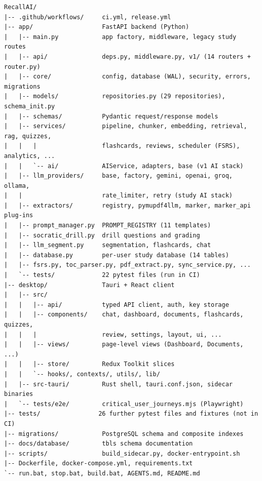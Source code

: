 \begin{lstlisting}[caption={Repository folder structure (commit \texttt{60d40f9})},label={lst:tree}]
RecallAI/
|-- .github/workflows/     ci.yml, release.yml
|-- app/                   FastAPI backend (Python)
|   |-- main.py            app factory, middleware, legacy study routes
|   |-- api/               deps.py, middleware.py, v1/ (14 routers + router.py)
|   |-- core/              config, database (WAL), security, errors, migrations
|   |-- models/            repositories.py (29 repositories), schema_init.py
|   |-- schemas/           Pydantic request/response models
|   |-- services/          pipeline, chunker, embedding, retrieval, rag, quizzes,
|   |   |                  flashcards, reviews, scheduler (FSRS), analytics, ...
|   |   `-- ai/            AIService, adapters, base (v1 AI stack)
|   |-- llm_providers/     base, factory, gemini, openai, groq, ollama,
|   |                      rate_limiter, retry (study AI stack)
|   |-- extractors/        registry, pymupdf4llm, marker, marker_api plug-ins
|   |-- prompt_manager.py  PROMPT_REGISTRY (11 templates)
|   |-- socratic_drill.py  drill questions and grading
|   |-- llm_segment.py     segmentation, flashcards, chat
|   |-- database.py        per-user study database (14 tables)
|   |-- fsrs.py, toc_parser.py, pdf_extract.py, sync_service.py, ...
|   `-- tests/             22 pytest files (run in CI)
|-- desktop/               Tauri + React client
|   |-- src/
|   |   |-- api/           typed API client, auth, key storage
|   |   |-- components/    chat, dashboard, documents, flashcards, quizzes,
|   |   |                  review, settings, layout, ui, ...
|   |   |-- views/         page-level views (Dashboard, Documents, ...)
|   |   |-- store/         Redux Toolkit slices
|   |   `-- hooks/, contexts/, utils/, lib/
|   |-- src-tauri/         Rust shell, tauri.conf.json, sidecar binaries
|   `-- tests/e2e/         critical_user_journeys.mjs (Playwright)
|-- tests/                26 further pytest files and fixtures (not in CI)
|-- migrations/            PostgreSQL schema and composite indexes
|-- docs/database/         tbls schema documentation
|-- scripts/               build_sidecar.py, docker-entrypoint.sh
|-- Dockerfile, docker-compose.yml, requirements.txt
`-- run.bat, stop.bat, build.bat, AGENTS.md, README.md
\end{lstlisting}

